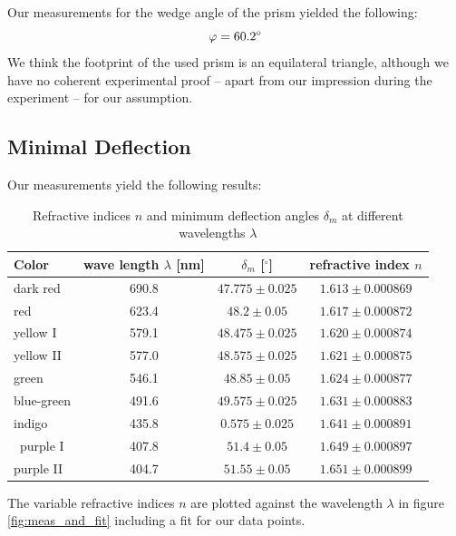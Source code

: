\documentclass{scrreprt}
\renewcommand{\phi}{\varphi}
\begin{document}
Our measurements for the wedge angle of the prism yielded the following:
\begin{equation}
	\phi = \ang{60.2}
\notag
\end{equation}
We think the footprint of the used prism is an equilateral triangle, although we have no coherent experimental proof -- apart from our impression during the experiment --  for our assumption.

\subsection{Minimal Deflection}

Our measurements yield the following results:

\begin{table}[H]
\centering
\begin{tabular}{|l|c|c|c|}
\hline
Color & wave length $\lambda$ [nm] & $\delta_m$ [$^\circ$] & refractive index $n$\\
\hline\hline
dark red & 690.8 & $47.775 \pm 0.025$  & $1.613 \pm 0.000869$\\
red & 623.4 & $48.2 \pm 0.05$ & $1.617 \pm 0.000872$\\
yellow I & 579.1 & $48.475 \pm 0.025$ & $1.620 \pm 0.000874$\\
yellow II & 577.0 & $48.575 \pm 0.025$ & $1.621 \pm 0.000875$\\
green & 546.1 & $48.85 \pm 0.05$ & $1.624 \pm 0.000877$\\
blue-green & 491.6 & $49.575 \pm 0.025$ & $1.631 \pm 0.000883$\\
indigo & 435.8 & $0.575 \pm 0.025$ & $1.641 \pm 0.000891$\\\
purple I & 407.8 & $51.4 \pm 0.05$ & $1.649 \pm 0.000897$\\
purple II & 404.7 & $51.55 \pm 0.05$ & $1.651 \pm 0.000899$\\\hline
\end{tabular}
\caption{Refractive indices $n$ and minimum deflection angles $\delta_m$ at different wavelengths $\lambda$}
\label{tab:n_results}
\end{table}

The variable refractive indices $n$ are plotted against the wavelength $\lambda$ in figure \ref{fig:meas_and_fit} including a fit for our data points.
\end{document}
